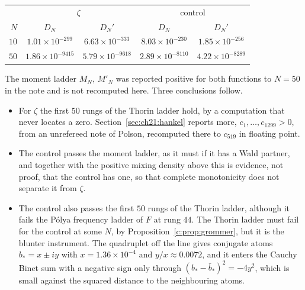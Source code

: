 \begin{center}
\footnotesize
\begin{tabular}{rcccc}
\toprule
 & \multicolumn{2}{c}{$\zeta$} & \multicolumn{2}{c}{control}\\
$N$ & $D_N$ & $D_N'$ & $D_N$ & $D_N'$\\
\midrule
$10$ & $1.01\times10^{-299}$ & $6.63\times10^{-333}$ & $8.03\times10^{-230}$ & $1.85\times10^{-256}$\\
$50$ & $1.86\times10^{-9415}$ & $5.79\times10^{-9618}$ & $2.89\times10^{-8110}$ & $4.22\times10^{-8289}$\\
\bottomrule
\end{tabular}
\end{center}
The moment ladder $M_N$, $M'_N$ was reported positive for both functions to $N=50$ in the note and is not recomputed here. Three conclusions follow.
\begin{itemize}
\item For $\zeta$ the first $50$ rungs of the Thorin ladder hold, by a computation that never locates a zero. Section~\ref{sec:ch21:hankel} reports more, $c_1,\dots,c_{1299}>0$, from an unrefereed note of Polson, recomputed there to $c_{519}$ in floating point.
\item The control passes the moment ladder, as it must if it has a Wald partner, and together with the positive mixing density above this is evidence, not proof, that the control has one, so that complete monotonicity does not separate it from $\zeta$.
\item The control also passes the first $50$ rungs of the Thorin ladder, although it fails the P\'olya frequency ladder of $F$ at rung $44$. The Thorin ladder must fail for the control at some $N$, by Proposition~\ref{c:prop:grommer}, but it is the blunter instrument. The quadruplet off the line gives conjugate atoms $b_*=x\pm iy$ with $x=1.36\times10^{-4}$ and $y/x\approx0.0072$, and it enters the Cauchy Binet sum with a negative sign only through $(b_*-\bar b_*)^2=-4y^2$, which is small against the squared distance to the neighbouring atoms.
\end{itemize}

